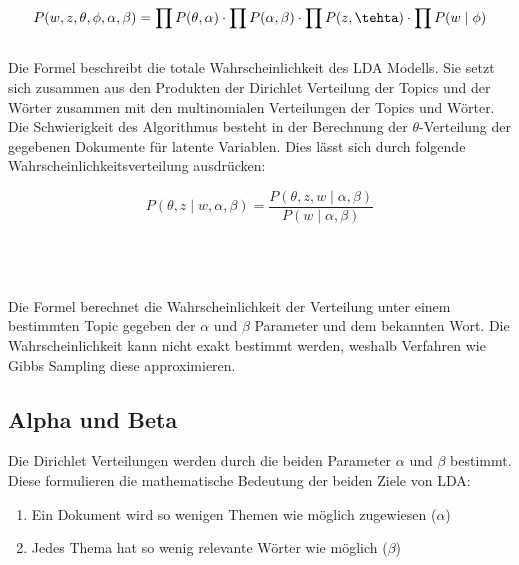 \documentclass[german,version-2020-11]{uzl-thesis}
\begin{document}
\begin{equation}
P(w,z,\theta, \phi, \alpha, \beta) = \prod P(\theta, \alpha) \cdot \prod P(\alpha, \beta) \cdot \prod P(z,\tehta) \cdot \prod P(w \mid \phi) 
\end{equation}
\\
Die Formel beschreibt die totale Wahrscheinlichkeit des LDA Modells. Sie setzt sich zusammen aus den Produkten der Dirichlet Verteilung der Topics und der Wörter zusammen mit den multinomialen Verteilungen der Topics und Wörter. Die Schwierigkeit des Algorithmus besteht in der Berechnung der $\theta$-Verteilung der gegebenen Dokumente für latente Variablen. Dies lässt sich durch folgende Wahrscheinlichkeitsverteilung ausdrücken: 

\begin{center}
\begin{equation}
P(\theta, z \mid w, \alpha, \beta) = \frac{P(\theta, z, w \mid \alpha, \beta)}{P(w \mid \alpha, \beta)}
\end{equation}
\end{center}\\
\\
\\
Die Formel berechnet die Wahrscheinlichkeit der Verteilung unter einem bestimmten Topic gegeben der $\alpha$ und $\beta$ Parameter und dem bekannten Wort. Die Wahrscheinlichkeit kann nicht exakt bestimmt werden, weshalb Verfahren wie Gibbs Sampling diese approximieren.\\

\subsection{Alpha und Beta}
Die Dirichlet Verteilungen werden durch die beiden Parameter $\alpha$ und $\beta$ bestimmt. Diese formulieren die mathematische Bedeutung der beiden Ziele von LDA:

\begin{enumerate}
	\item Ein Dokument wird so wenigen Themen wie möglich zugewiesen ($\alpha$)
	\item Jedes Thema hat so wenig relevante Wörter wie möglich ($\beta$)
\end{enumerate}
\end{document}
